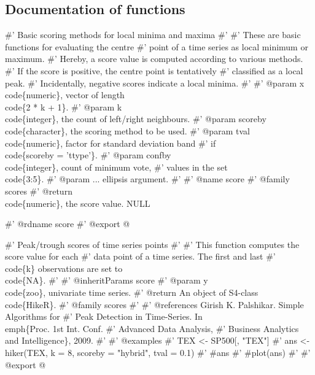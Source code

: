 \documentclass[a4paper]{article}
\begin{document}
\subsection{Documentation of functions}

\nwenddocs{}\endmoddef
#' Basic scoring methods for local minima and maxima
#'
#' These are basic functions for evaluating the centre
#' point of a time series as local minimum or maximum.
#' Hereby, a score value is computed according to various methods.
#' If the score is positive, the centre point is tentatively
#' classified as a local peak.
#' Incidentally, negative scores indicate a local minima.
#'
#' @param x \\code\{numeric\}, vector of length \\code\{2 * k + 1\}.
#' @param k \\code\{integer\}, the count of left/right neighbours.
#' @param scoreby \\code\{character\}, the scoring method to be used.
#' @param tval \\code\{numeric\}, factor for standard deviation band
#' if \\code\{scoreby = 'ttype'\}.
#' @param confby \\code\{integer\}, count of minimum vote,
#' values in the set \\code\{3:5\}.
#' @param ... ellipsis argument.
#'
#' @name score
#' @family scores
#' @return \\code\{numeric\}, the score value.
NULL

#' @rdname score
#' @export
\nwendcode{}@

\nwenddocs{}\endmoddef
#' Peak/trough scores of time series points
#'
#' This function computes the score value for each
#' data point of a time series. The first and last
#' \\code\{k\} observations are set to \\code\{NA\}.
#'
#' @inheritParams score
#' @param y \\code\{zoo\}, univariate time series.
#' @return An object of S4-class \\code\{HikeR\}.
#' @family scores
#'
#' @references Girish K. Palshikar. Simple Algorithms for
#' Peak Detection in Time-Series. In \\emph\{Proc. 1st Int. Conf.
#' Advanced Data Analysis,
#' Business Analytics and Intelligence\}, 2009.
#'
#' @examples
#' TEX <- SP500[, "TEX"]
#' ans <- hiker(TEX, k = 8, scoreby = "hybrid", tval = 0.1)
#' #ans
#' #plot(ans)
#'
#' @export
\nwendcode{}@
\end{document}
